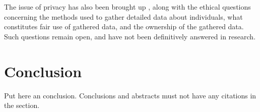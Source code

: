 \documentclass[sigconf]{acmart}
\begin{document}
The issue of privacy has also been brought up \cite{stough_2014}, along with the ethical questions concerning the methods used to gather detailed data about individuals, what constitutes fair use of gathered data, and the ownership of the gathered data. Such questions remain open, and have not been definitively answered in research.


\section{Conclusion}
Put here an conclusion. Conclusions and abstracts must not have any
citations in the section.



 
\end{document}
